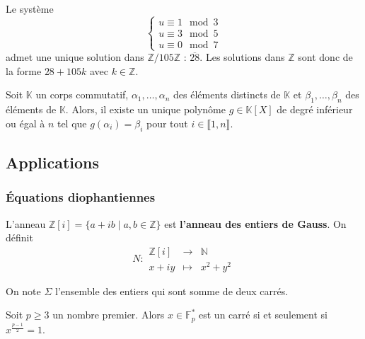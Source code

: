 	\begin{example}
		Le système
		\[
			\begin{cases}
				u \equiv 1 \mod 3 \\
				u \equiv 3 \mod 5 \\
				u \equiv 0 \mod 7
			\end{cases}
		\]
		admet une unique solution dans $\mathbb{Z}/105\mathbb{Z}$ : $\overline{28}$. Les solutions dans $\mathbb{Z}$ sont donc de la forme $28 + 105k$ avec $k \in \mathbb{Z}$.
	\end{example}

	\begin{application}
		Soit $\mathbb{K}$ un corps commutatif, $\alpha_1, \dots, \alpha_n$ des éléments distincts de $\mathbb{K}$ et $\beta_1, \dots, \beta_n$ des éléments de $\mathbb{K}$. Alors, il existe un unique polynôme $g \in \mathbb{K}[X]$ de degré inférieur ou égal à $n$ tel que $g(\alpha_i) = \beta_i$ pour tout $i \in \llbracket 1, n \rrbracket$.
	\end{application}

	\subsection{Applications}

	\subsubsection{Équations diophantiennes}


	\begin{definition}
		L'anneau $\mathbb{Z}[i] = \{ a + ib \mid a, b \in \mathbb{Z} \}$ est \textbf{l'anneau des entiers de Gauss}. On définit
		\[
			N :
			\begin{array}{ccc}
				\mathbb{Z}[i] &\rightarrow& \mathbb{N} \\
				x+iy &\mapsto& x^2 + y^2
			\end{array}
		\]
	\end{definition}


	\begin{notation}
		On note $\Sigma$ l'ensemble des entiers qui sont somme de deux carrés.
	\end{notation}

	\begin{lemma}
		Soit $p \geq 3$ un nombre premier. Alors $x \in \mathbb{F}^*_p$ est un carré si et seulement si $x^{\frac{p-1}{2}} = 1$.
	\end{lemma}

